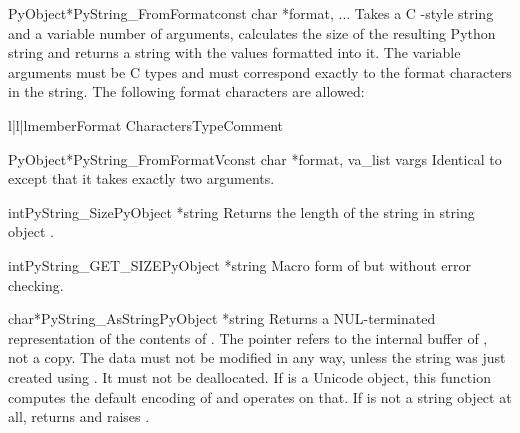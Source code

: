 \begin{cfuncdesc}{PyObject*}{PyString_FromFormat}{const char *format, ...}
  Takes a C -style  string and a
  variable number of arguments, calculates the size of the resulting
  Python string and returns a string with the values formatted into
  it.  The variable arguments must be C types and must correspond
  exactly to the format characters in the  string.  The
  following format characters are allowed:

  \begin{tableiii}{l|l|l}{member}{Format Characters}{Type}{Comment}
  \end{tableiii}
\end{cfuncdesc}

\begin{cfuncdesc}{PyObject*}{PyString_FromFormatV}{const char *format,
                                                   va_list vargs}
  Identical to  except that it takes
  exactly two arguments.
\end{cfuncdesc}

\begin{cfuncdesc}{int}{PyString_Size}{PyObject *string}
  Returns the length of the string in string object .
\end{cfuncdesc}

\begin{cfuncdesc}{int}{PyString_GET_SIZE}{PyObject *string}
  Macro form of  but without error
  checking.
\end{cfuncdesc}

\begin{cfuncdesc}{char*}{PyString_AsString}{PyObject *string}
  Returns a NUL-terminated representation of the contents of
  .  The pointer refers to the internal buffer of
  , not a copy.  The data must not be modified in any way,
  unless the string was just created using
  .
  It must not be deallocated.  If  is a Unicode object,
  this function computes the default encoding of  and
  operates on that.  If  is not a string object at all,
   returns \NULL{} and raises
  .
\end{cfuncdesc}

